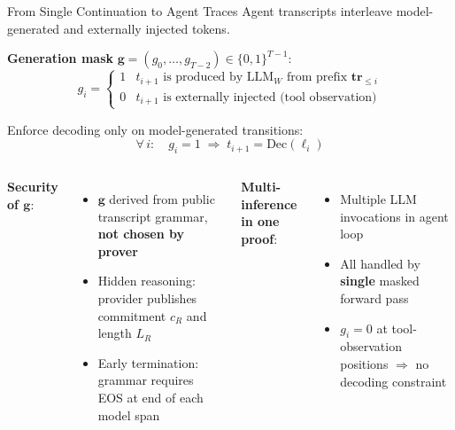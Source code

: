 \documentclass[aspectratio=169,10pt]{beamer}
\newcommand{\tr}{\mathbf{tr}}
\begin{document}
\begin{frame}{From Single Continuation to Agent Traces}
Agent transcripts interleave model-generated and externally injected tokens.

\vspace{4pt}
\textbf{Generation mask} $\mathbf{g} = (g_0, \ldots, g_{T-2}) \in \{0,1\}^{T-1}$:
\[
  g_i = \begin{cases}
    1 & t_{i+1} \text{ is produced by } \mathrm{LLM}_W \text{ from prefix } \tr_{\leq i} \\
    0 & t_{i+1} \text{ is externally injected (tool observation)}
  \end{cases}
\]

Enforce decoding only on model-generated transitions:
\[
  \forall\, i: \quad g_i = 1 \;\Rightarrow\; t_{i+1} = \mathrm{Dec}(\boldsymbol{\ell}_i)
\]

\vspace{4pt}
\begin{columns}[T]
\textbf{Security of $\mathbf{g}$}:
\begin{itemize}
  \item $\mathbf{g}$ derived from public transcript grammar, \textbf{not chosen by prover}
  \item Hidden reasoning: provider publishes commitment $c_R$ and length $L_R$
  \item Early termination: grammar requires EOS at end of each model span
\end{itemize}

\textbf{Multi-inference in one proof}:
\begin{itemize}
  \item Multiple LLM invocations in agent loop
  \item All handled by \textbf{single} masked forward pass
  \item $g_i = 0$ at tool-observation positions $\Rightarrow$ no decoding constraint
\end{itemize}
\end{columns}
\end{frame}

\end{document}
